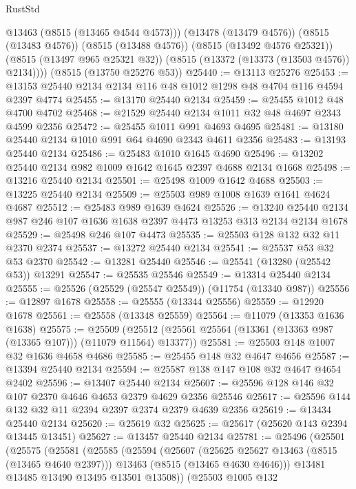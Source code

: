 \begin{lexlean}{RustStd}
\begin{coremodule}
          @13463
          (@8515 (@13465 @4544 @4573)))
        (@13478 (@13479 @4576))
        (@8515 (@13483 @4576))
        (@8515 (@13488 @4576))
        (@8515 (@13492 @4576 @25321))
        (@8515 (@13497 @965 @25321 @32))
        (@8515 (@13372 (@13373 (@13503 @4576)) @2134))))
    (@8515 (@13750 @25276 @53))
@25440 := @13113 @25276
@25453 := @13153 @25440 @2134 @2134 @116 @48 @1012 @1298 @48 @4704 @116 @4594 @2397 @4774
@25455 := @13170 @25440 @2134
@25459 := @25455 @1012 @48 @4700 @4702
@25468 := @21529 @25440 @2134 @1011 @32 @48 @4697 @2343 @4599 @2356
@25472 := @25455 @1011 @991 @4693 @4695
@25481 := @13180 @25440 @2134 @1010 @991 @64 @4690 @2343 @4611 @2356
@25483 := @13193 @25440 @2134
@25486 := @25483 @1010 @1645 @4690
@25496 := @13202 @25440 @2134 @982 @1009 @1642 @1645 @2397 @4688 @2134 @1668
@25498 := @13216 @25440 @2134
@25501 := @25498 @1009 @1642 @4688
@25503 := @13225 @25440 @2134
@25509 := @25503 @989 @1008 @1639 @1641 @4624 @4687
@25512 := @25483 @989 @1639 @4624
@25526 := @13240 @25440 @2134 @987 @246 @107 @1636 @1638 @2397 @4473 @13253 @313 @2134 @2134 @1678
@25529 := @25498 @246 @107 @4473
@25535 := @25503 @128 @132 @32 @11 @2370 @2374
@25537 := @13272 @25440 @2134
@25541 := @25537 @53 @32 @53 @2370
@25542 := @13281 @25440
@25546 := @25541 (@13280 (@25542 @53)) @13291
@25547 := @25535 @25546
@25549 := @13314 @25440 @2134
@25555 := @25526 (@25529 (@25547 @25549)) (@11754 (@13340 @987))
@25556 := @12897 @1678
@25558 := @25555 (@13344 @25556)
@25559 := @12920 @1678
@25561 := @25558 (@13348 @25559)
@25564 := @11079 (@13353 @1636 @1638)
@25575 := @25509
    (@25512 (@25561 @25564 (@13361 (@13363 @987 (@13365 @107))) (@11079 @11564) @13377))
@25581 := @25503 @148 @1007 @32 @1636 @4658 @4686
@25585 := @25455 @148 @32 @4647 @4656
@25587 := @13394 @25440 @2134
@25594 := @25587 @138 @147 @108 @32 @4647 @4654 @2402
@25596 := @13407 @25440 @2134
@25607 := @25596 @128 @146 @32 @107 @2370 @4646 @4653 @2379 @4629 @2356 @25546
@25617 := @25596 @144 @132 @32 @11 @2394 @2397 @2374 @2379 @4639 @2356
@25619 := @13434 @25440 @2134
@25620 := @25619 @32
@25625 := @25617 (@25620 @143 @2394 @13445 @13451)
@25627 := @13457 @25440 @2134
@25781 := @25496
    (@25501
      (@25575
        (@25581
          (@25585
            (@25594
              (@25607
                (@25625 @25627 @13463 (@8515 (@13465 @4640 @2397)))
                @13463
                (@8515 (@13465 @4630 @4646)))
              @13481
              @13485
              @13490
              @13495
              @13501
              @13508))
          (@25503
            @1005
            @132

\end{coremodule}
\end{lexlean}
